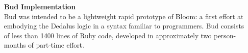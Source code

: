 

\vspace{9pt}\noindent \textbf{Bud Implementation}\\
Bud was intended to be a lightweight rapid prototype of Bloom: a first effort at embodying the Dedalus logic in a syntax familiar to programmers.  Bud consists of less than 1400 lines of Ruby code, developed in approximately two person-months of part-time effort.


\begin{comment}
A Bud program is just a Ruby class definition.  To make it operational, a small amount of imperative Ruby code is needed to create an instance of the class and invoke the Bud \texttt{run} method.  This imperative code can then be launched on as many nodes as desired (e.g., via the popular Capistrano package for Ruby deployments).  Messages targeted at those nodes are handled according to the Bud specification.  As an alternative to the \texttt{run} method, the Bud class also provides a \texttt{tick} method that can be used to force evaluation of a single timestep; this is useful for debugging Bloom code with standard Ruby debugging tools, or for executing a Bud specification that is intended as a ``one-shot'' query.

\jmh{The next paragraph could easily be chopped.  The preceding paragraph too, but it's more important to understand how things work.}
Because Bud is pure Ruby, some programmers may choose to embed it as a Domain-Specific Language within traditional imperative Ruby code.  In fact, nothing prevents a subclass of Bud from having both Bloom code in \texttt{declare} methods and imperative code in traditional Ruby methods.  This is a fairly common usage model, akin to using the Ruby on Rails package to integrate declarative data management statements with imperative Ruby. A mixture of declarative Bloom methods and imperative Ruby allows the full range of existing Ruby code---including the extensive RubyGems repositories---to be combined with checkable distributed Bloom programs. The analyses we describe in the remaining sections still apply in these cases; the imperative Ruby code interacts with the Bloom logic in the same way as any external agent sending network messages.
\end{comment}
